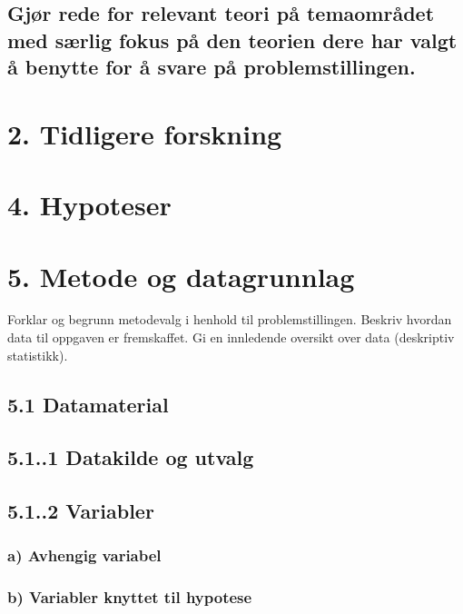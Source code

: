 \documentclass[
  11pt,
  a4paper,
  DIV=11,
  numbers=noendperiod]{scrartcl}
\begin{document}
\subsection{Gjør rede for relevant teori på temaområdet med særlig fokus
på den teorien dere har valgt å benytte for å svare på
problemstillingen.}\label{gjuxf8r-rede-for-relevant-teori-puxe5-temaomruxe5det-med-suxe6rlig-fokus-puxe5-den-teorien-dere-har-valgt-uxe5-benytte-for-uxe5-svare-puxe5-problemstillingen.}

\section{2. Tidligere forskning}\label{tidligere-forskning}

\section{4. Hypoteser}\label{hypoteser}

\section{5. Metode og datagrunnlag}\label{metode-og-datagrunnlag}

Forklar og begrunn metodevalg i henhold til problemstillingen. Beskriv
hvordan data til oppgaven er fremskaffet. Gi en innledende oversikt over
data (deskriptiv statistikk).

\subsection{5.1 Datamaterial}\label{datamaterial}

\subsection{5.1..1 Datakilde og utvalg}\label{datakilde-og-utvalg}

\subsection{5.1..2 Variabler}\label{variabler}

\subsubsection{a) Avhengig variabel}\label{a-avhengig-variabel}

\subsubsection{b) Variabler knyttet til
hypotese}\label{b-variabler-knyttet-til-hypotese}
\end{document}
